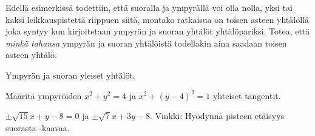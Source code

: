\begin{tehtavasivu}
\begin{tehtava}
Edellä esimerkissä todettiin, että suoralla ja ympyrällä voi olla nolla, yksi tai kaksi leikkauspistettä riippuen siitä, montako ratkaisua on toisen asteen yhtälöllä joka syntyy kun kirjoitetaan ympyrän ja suoran yhtälöt yhtälöpariksi. Totea, että \emph{minkä tahansa} ympyrän ja suoran yhtälöistä todellakin aina saadaan toisen asteen yhtälö.
\begin{vastaus}
Ympyrän ja suoran yleiset yhtälöt.
\end{vastaus}
\end{tehtava}

\begin{tehtava}
Määritä ympyröiden $x^2+y^2 = 4$ ja $x^2+(y-4)^2 = 1$ yhteiset tangentit.

\begin{vastaus}
$\pm\sqrt{15}x+y-8= 0$ ja $\pm\sqrt{7}x+3y-8$. Vinkki: Hyödynnä pisteen etäisyys suorasta -kaavaa.
\end{vastaus}
\end{tehtava}


\end{tehtavasivu}